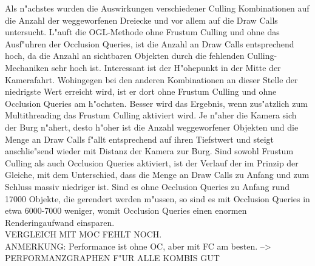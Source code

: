 \documentclass[journal]{vgtc}
\begin{document}
Als n"achstes wurden die Auswirkungen verschiedener Culling Kombinationen auf die Anzahl der weggeworfenen Dreiecke und vor allem auf die Draw Calls untersucht. L"auft die OGL-Methode ohne Frustum Culling und ohne das Ausf"uhren der Occlusion Queries, ist die Anzahl an Draw Calls entsprechend hoch, da die Anzahl an sichtbaren Objekten durch die fehlenden Culling-Mechaniken sehr hoch ist. Interessant ist der H"ohepunkt in der Mitte der Kamerafahrt. Wohingegen bei den anderen Kombinationen an dieser Stelle der niedrigste Wert erreicht wird, ist er dort ohne Frustum Culling und ohne Occlusion Queries am h"ochsten. Besser wird das Ergebnis, wenn zus"atzlich zum Multithreading das Frustum Culling aktiviert wird. Je n"aher die Kamera sich der Burg n"ahert, desto h"oher ist die Anzahl weggeworfener Objekten und die Menge an Draw Calls f"allt entsprechend auf ihren Tiefstwert und steigt anschlie"send wieder mit Distanz der Kamera zur Burg. Sind sowohl Frustum Culling als auch Occlusion Queries aktiviert, ist der Verlauf der im Prinzip der Gleiche, mit dem Unterschied, dass die Menge an Draw Calls zu Anfang und zum Schluss massiv niedriger ist. Sind es ohne Occlusion Queries zu Anfang rund 17000 Objekte, die gerendert werden m"ussen, so sind es mit Occlusion Queries in etwa 6000-7000 weniger, womit Occlusion Queries einen enormen Renderingaufwand einsparen.\\
VERGLEICH MIT MOC FEHLT NOCH.\\
ANMERKUNG: Performance ist ohne OC, aber mit FC am besten. --> PERFORMANZGRAPHEN F"UR ALLE KOMBIS GUT
\end{document}
